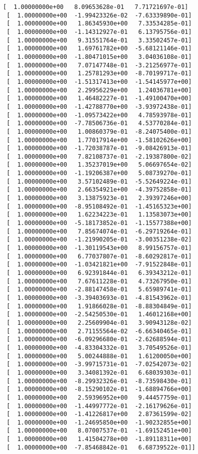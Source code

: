 \documentclass[11pt]{article}
\begin{document}
\begin{Verbatim}[commandchars=\\\{\}]
 [  1.00000000e+00   8.09653628e-01   7.71721697e-01]
 [  1.00000000e+00  -1.99423326e-02  -7.63339890e-01]
 [  1.00000000e+00   1.86345930e+00   7.33534285e-01]
 [  1.00000000e+00  -1.14312927e-01   6.13795756e-01]
 [  1.00000000e+00   9.31551764e-01   3.33502457e-01]
 [  1.00000000e+00   1.69761782e+00  -5.68121146e-01]
 [  1.00000000e+00  -1.80471015e+00   3.04036108e-01]
 [  1.00000000e+00   7.07147748e-01  -3.21256977e-01]
 [  1.00000000e+00   1.25781293e+00  -8.70199717e-01]
 [  1.00000000e+00  -1.51317413e+00  -1.54145977e+00]
 [  1.00000000e+00   2.29956229e+00   1.24036781e+00]
 [  1.00000000e+00   1.46482227e-01  -1.49100470e+00]
 [  1.00000000e+00  -1.42788770e+00  -3.93972438e-01]
 [  1.00000000e+00  -1.09573422e+00   4.78593978e-01]
 [  1.00000000e+00  -7.78506736e-01   4.53770284e-01]
 [  1.00000000e+00   1.00860379e-01  -8.24075400e-01]
 [  1.00000000e+00   1.77017914e+00  -1.58102626e+00]
 [  1.00000000e+00  -1.72038787e-01  -9.08426913e-01]
 [  1.00000000e+00   7.82108737e-01  -2.19387800e-02]
 [  1.00000000e+00   1.35237019e+00   5.06697654e-02]
 [  1.00000000e+00  -1.19206387e+00   5.08739270e-01]
 [  1.00000000e+00   3.57102489e-01  -5.52649224e-01]
 [  1.00000000e+00   2.66354921e+00  -4.39752858e-01]
 [  1.00000000e+00   3.13875923e-01   2.39397246e+00]
 [  1.00000000e+00  -8.95108492e-01  -1.45165323e+00]
 [  1.00000000e+00   1.62234223e-01   1.13583073e+00]
 [  1.00000000e+00  -5.18173852e-01  -1.15577388e+00]
 [  1.00000000e+00   7.85674074e-01  -6.29719264e-01]
 [  1.00000000e+00  -1.21990205e-01  -3.00351238e-02]
 [  1.00000000e+00  -1.30119543e+00   8.99156757e-01]
 [  1.00000000e+00   6.77037807e-01  -8.60292817e-01]
 [  1.00000000e+00  -1.03421821e+00  -7.91522848e-01]
 [  1.00000000e+00   6.92391844e-01   6.39343212e-01]
 [  1.00000000e+00   7.67611228e-01   4.73267950e-01]
 [  1.00000000e+00  -2.88147458e-01   5.65989741e-01]
 [  1.00000000e+00  -3.39403693e-01  -4.81543962e-01]
 [  1.00000000e+00   1.91866028e-01  -8.88304849e-01]
 [  1.00000000e+00  -2.54250530e-01   1.46012168e+00]
 [  1.00000000e+00   2.25609904e-01   3.90943128e-02]
 [  1.00000000e+00   2.71155564e-02  -6.66340465e-01]
 [  1.00000000e+00  -6.09296680e-01  -2.62688594e-01]
 [  1.00000000e+00  -4.83304332e-01   3.70549526e-01]
 [  1.00000000e+00   5.00244888e-01   1.61200050e+00]
 [  1.00000000e+00  -3.99715731e-01  -7.02542073e-02]
 [  1.00000000e+00   3.34081392e-01   6.68039303e-01]
 [  1.00000000e+00  -8.29932326e-01  -8.73598430e-01]
 [  1.00000000e+00  -8.15290102e-01  -1.68894766e+00]
 [  1.00000000e+00   2.59396952e+00   9.44457759e-01]
 [  1.00000000e+00  -1.44997772e-01  -2.16179626e-01]
 [  1.00000000e+00  -1.41226817e+00   2.87361599e-02]
 [  1.00000000e+00  -1.24695850e+00  -1.90232855e+00]
 [  1.00000000e+00   8.07007537e-01  -1.69152451e+00]
 [  1.00000000e+00   1.41504278e+00  -1.89118311e+00]
 [  1.00000000e+00  -7.85468842e-01   6.68739522e-01]]

    \end{Verbatim}
\end{document}

